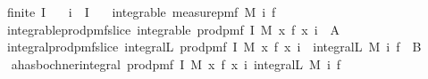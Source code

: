 \begin{isabellebody}
\ \ \ {\isachardoublequoteopen}finite\ I{\isachardoublequoteclose}\isanewline
\ \ \ {\isachardoublequoteopen}i\ {\isasymin}\ I{\isachardoublequoteclose}\isanewline
\ \ \ {\isachardoublequoteopen}integrable\ {\isacharparenleft}{\kern0pt}measure{\isacharunderscore}{\kern0pt}pmf\ {\isacharparenleft}{\kern0pt}M\ i{\isacharparenright}{\kern0pt}{\isacharparenright}{\kern0pt}\ f{\isachardoublequoteclose}\isanewline
\ \ \ integrable{\isacharunderscore}{\kern0pt}prod{\isacharunderscore}{\kern0pt}pmf{\isacharunderscore}{\kern0pt}slice{\isacharcolon}{\kern0pt}\ {\isachardoublequoteopen}integrable\ {\isacharparenleft}{\kern0pt}prod{\isacharunderscore}{\kern0pt}pmf\ I\ M{\isacharparenright}{\kern0pt}\ {\isacharparenleft}{\kern0pt}{\isasymlambda}x{\isachardot}{\kern0pt}\ {\isacharparenleft}{\kern0pt}f\ {\isacharparenleft}{\kern0pt}x\ i{\isacharparenright}{\kern0pt}{\isacharparenright}{\kern0pt}{\isacharparenright}{\kern0pt}{\isachardoublequoteclose}\ {\isacharparenleft}{\kern0pt}\ {\isacharquery}{\kern0pt}A{\isacharparenright}{\kern0pt}\ \isanewline
\ \ \ integral{\isacharunderscore}{\kern0pt}prod{\isacharunderscore}{\kern0pt}pmf{\isacharunderscore}{\kern0pt}slice{\isacharcolon}{\kern0pt}\ {\isachardoublequoteopen}integral\isactrlsup L\ {\isacharparenleft}{\kern0pt}prod{\isacharunderscore}{\kern0pt}pmf\ I\ M{\isacharparenright}{\kern0pt}\ {\isacharparenleft}{\kern0pt}{\isasymlambda}x{\isachardot}{\kern0pt}\ {\isacharparenleft}{\kern0pt}f\ {\isacharparenleft}{\kern0pt}x\ i{\isacharparenright}{\kern0pt}{\isacharparenright}{\kern0pt}{\isacharparenright}{\kern0pt}\ {\isacharequal}{\kern0pt}\ integral\isactrlsup L\ {\isacharparenleft}{\kern0pt}M\ i{\isacharparenright}{\kern0pt}\ f{\isachardoublequoteclose}\ {\isacharparenleft}{\kern0pt}\ {\isacharquery}{\kern0pt}B{\isacharparenright}{\kern0pt}\isanewline
%
\isadelimproof
%
\endisadelimproof
%
\isatagproof
{}\isamarkupfalse%
\ {\isacharminus}{\kern0pt}\isanewline
\ \ \isamarkupfalse%
\ a{\isacharcolon}{\kern0pt}{\isachardoublequoteopen}has{\isacharunderscore}{\kern0pt}bochner{\isacharunderscore}{\kern0pt}integral\ {\isacharparenleft}{\kern0pt}prod{\isacharunderscore}{\kern0pt}pmf\ I\ M{\isacharparenright}{\kern0pt}\ {\isacharparenleft}{\kern0pt}{\isasymlambda}x{\isachardot}{\kern0pt}\ {\isacharparenleft}{\kern0pt}f\ {\isacharparenleft}{\kern0pt}x\ i{\isacharparenright}{\kern0pt}{\isacharparenright}{\kern0pt}{\isacharparenright}{\kern0pt}\ {\isacharparenleft}{\kern0pt}integral\isactrlsup L\ {\isacharparenleft}{\kern0pt}M\ i{\isacharparenright}{\kern0pt}\ f{\isacharparenright}{\kern0pt}{\isachardoublequoteclose}\isanewline

\end{isabellebody}
